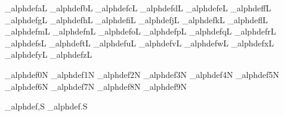 \brl@alph_alphdef{a}{L}
\brl@alph_alphdef{b}{L}
\brl@alph_alphdef{c}{L}
\brl@alph_alphdef{d}{L}
\brl@alph_alphdef{e}{L}
\brl@alph_alphdef{f}{L}
\brl@alph_alphdef{g}{L}
\brl@alph_alphdef{h}{L}
\brl@alph_alphdef{i}{L}
\brl@alph_alphdef{j}{L}
\brl@alph_alphdef{k}{L}
\brl@alph_alphdef{l}{L}
\brl@alph_alphdef{m}{L}
\brl@alph_alphdef{n}{L}
\brl@alph_alphdef{o}{L}
\brl@alph_alphdef{p}{L}
\brl@alph_alphdef{q}{L}
\brl@alph_alphdef{r}{L}
\brl@alph_alphdef{s}{L}
\brl@alph_alphdef{t}{L}
\brl@alph_alphdef{u}{L}
\brl@alph_alphdef{v}{L}
\brl@alph_alphdef{w}{L}
\brl@alph_alphdef{x}{L}
\brl@alph_alphdef{y}{L}
\brl@alph_alphdef{z}{L}

\brl@alph_alphdef{0}{N}
\brl@alph_alphdef{1}{N}
\brl@alph_alphdef{2}{N}
\brl@alph_alphdef{3}{N}
\brl@alph_alphdef{4}{N}
\brl@alph_alphdef{5}{N}
\brl@alph_alphdef{6}{N}
\brl@alph_alphdef{7}{N}
\brl@alph_alphdef{8}{N}
\brl@alph_alphdef{9}{N}

\def\brl@alph_numbermode{%
  \brl@alph_alphdef{,}{N}
  \brl@alph_alphdef{.}{N}
}
\def\brl@alph_alphmode{%
  \brl@alph_alphdef{,}{S}
  \brl@alph_alphdef{.}{S}
}

%
\brl@alph_alphmode

\endinput


